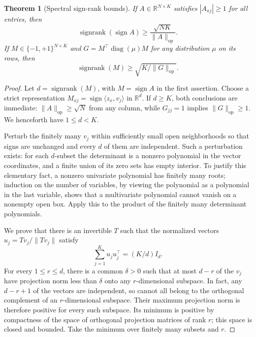 \documentclass[11pt]{article}
\newtheorem{theorem}{Theorem}
\DeclareMathOperator{\sr}{signrank}
\DeclareMathOperator{\sign}{sign}
\DeclareMathOperator{\diag}{diag}
\newcommand{\R}{\mathbb R}
\newcommand{\1}{\mathbf 1}
\newcommand{\op}{\mathrm{op}}
\begin{document}
\begin{samepage}
\begin{theorem}[Spectral sign-rank bounds]\label{thm:forster}
If $A\in\R^{N\times K}$ satisfies $|A_{xj}|\geq1$ for all entries, then
\begin{equation}\label{eq:forster}
 \sr(\sign A)\geq\frac{\sqrt{NK}}{\|A\|_\op}.
\end{equation}
If $M\in\{-1,+1\}^{N\times K}$ and $G=M^\top\diag(\mu)M$ for any distribution $\mu$ on its rows, then
\begin{equation}\label{eq:weighted}
 \sr(M)\geq\sqrt{K/\|G\|_\op}.
\end{equation}
\end{theorem}
\end{samepage}
\begin{proof}
Let $d=\sr(M)$, with $M=\sign A$ in the first assertion. Choose a strict representation
$M_{xj}=\sign\langle z_x,v_j\rangle$ in $\R^d$. If $d\geq K$, both conclusions are immediate: $\|A\|_\op\geq\sqrt N$ from any column, while $G_{jj}=1$ implies $\|G\|_\op\geq1$. We henceforth have $1\leq d<K$.

Perturb the finitely many $v_j$ within sufficiently small open neighborhoods so that signs are unchanged and every $d$ of them are independent. Such a perturbation exists: for each $d$-subset the determinant is a nonzero polynomial in the vector coordinates, and a finite union of its zero sets has empty interior. To justify this elementary fact, a nonzero univariate polynomial has finitely many roots; induction on the number of variables, by viewing the polynomial as a polynomial in the last variable, shows that a multivariate polynomial cannot vanish on a nonempty open box. Apply this to the product of the finitely many determinant polynomials.

We prove that there is an invertible $T$ such that the normalized vectors
$u_j=Tv_j/\|Tv_j\|$ satisfy
\begin{equation}\label{eq:isotropy}
 \sum_{j=1}^K u_ju_j^\top=(K/d)I_d.
\end{equation}
For every $1\leq r\leq d$, there is a common $\delta>0$ such that at most $d-r$ of the $v_j$ have projection norm less than $\delta$ onto any $r$-dimensional subspace. In fact, any $d-r+1$ of the vectors are independent, so cannot all belong to the orthogonal complement of an $r$-dimensional subspace. Their maximum projection norm is therefore positive for every such subspace. Its minimum is positive by compactness of the space of orthogonal projection matrices of rank $r$; this space is closed and bounded. Take the minimum over finitely many subsets and $r$.


\end{proof}
\end{document}
